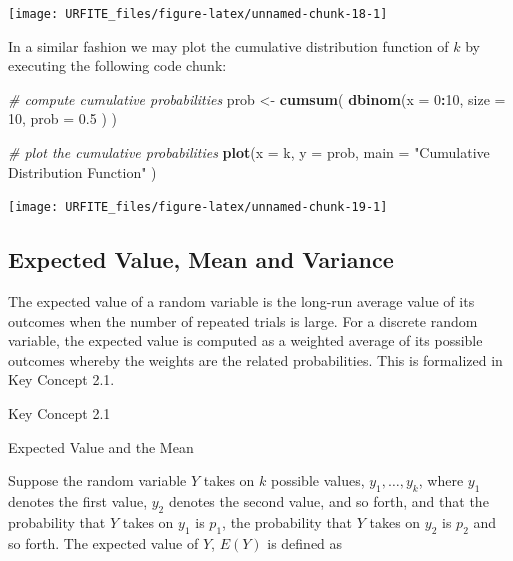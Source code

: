 \documentclass[]{book}
\newenvironment{Shaded}{\begin{snugshade}}{\end{snugshade}}
\newcommand{\KeywordTok}[1]{\textcolor[rgb]{0.13,0.29,0.53}{\textbf{#1}}}
\newcommand{\DataTypeTok}[1]{\textcolor[rgb]{0.13,0.29,0.53}{#1}}
\newcommand{\DecValTok}[1]{\textcolor[rgb]{0.00,0.00,0.81}{#1}}
\newcommand{\FloatTok}[1]{\textcolor[rgb]{0.00,0.00,0.81}{#1}}
\newcommand{\StringTok}[1]{\textcolor[rgb]{0.31,0.60,0.02}{#1}}
\newcommand{\CommentTok}[1]{\textcolor[rgb]{0.56,0.35,0.01}{\textit{#1}}}
\newcommand{\OperatorTok}[1]{\textcolor[rgb]{0.81,0.36,0.00}{\textbf{#1}}}
\newcommand{\NormalTok}[1]{#1}
\theoremstyle{definition}
\theoremstyle{definition}
\theoremstyle{definition}
\theoremstyle{remark}
\begin{document}
\begin{center}\texttt{[image: URFITE\_files/figure-latex/unnamed-chunk-18-1]} \end{center}

In a similar fashion we may plot the cumulative distribution function of
\(k\) by executing the following code chunk:

\begin{Shaded}
\begin{Highlighting}[]
\CommentTok{# compute cumulative probabilities}
\NormalTok{prob <-}\StringTok{ }\KeywordTok{cumsum}\NormalTok{(}
              \KeywordTok{dbinom}\NormalTok{(}\DataTypeTok{x =} \DecValTok{0}\OperatorTok{:}\DecValTok{10}\NormalTok{, }
                     \DataTypeTok{size =} \DecValTok{10}\NormalTok{, }
                     \DataTypeTok{prob =} \FloatTok{0.5}
\NormalTok{                     )}
\NormalTok{              )}

\CommentTok{# plot the cumulative probabilities}
\KeywordTok{plot}\NormalTok{(}\DataTypeTok{x =}\NormalTok{ k, }
     \DataTypeTok{y =}\NormalTok{ prob,}
     \DataTypeTok{main =} \StringTok{"Cumulative Distribution Function"}
\NormalTok{     ) }
\end{Highlighting}
\end{Shaded}

\begin{center}\texttt{[image: URFITE\_files/figure-latex/unnamed-chunk-19-1]} \end{center}

\subsection*{Expected Value, Mean and
Variance}\label{expected-value-mean-and-variance}

The expected value of a random variable is the long-run average value of
its outcomes when the number of repeated trials is large. For a discrete
random variable, the expected value is computed as a weighted average of
its possible outcomes whereby the weights are the related probabilities.
This is formalized in Key Concept 2.1.

Key Concept 2.1

Expected Value and the Mean

Suppose the random variable \(Y\) takes on \(k\) possible values,
\(y_1, \dots, y_k\), where \(y_1\) denotes the first value, \(y_2\)
denotes the second value, and so forth, and that the probability that
\(Y\) takes on \(y_1\) is \(p_1\), the probability that \(Y\) takes on
\(y_2\) is \(p_2\) and so forth. The expected value of \(Y\), \(E(Y)\)
is defined as
\end{document}

